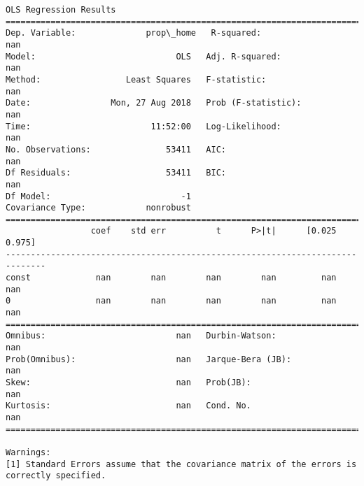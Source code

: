 \documentclass[11pt]{article}
\begin{document}
    \begin{Verbatim}[commandchars=\\\{\}]
                            OLS Regression Results                            
==============================================================================
Dep. Variable:              prop\_home   R-squared:                         nan
Model:                            OLS   Adj. R-squared:                    nan
Method:                 Least Squares   F-statistic:                       nan
Date:                Mon, 27 Aug 2018   Prob (F-statistic):                nan
Time:                        11:52:00   Log-Likelihood:                    nan
No. Observations:               53411   AIC:                               nan
Df Residuals:                   53411   BIC:                               nan
Df Model:                          -1                                         
Covariance Type:            nonrobust                                         
==============================================================================
                 coef    std err          t      P>|t|      [0.025      0.975]
------------------------------------------------------------------------------
const             nan        nan        nan        nan         nan         nan
0                 nan        nan        nan        nan         nan         nan
==============================================================================
Omnibus:                          nan   Durbin-Watson:                     nan
Prob(Omnibus):                    nan   Jarque-Bera (JB):                  nan
Skew:                             nan   Prob(JB):                          nan
Kurtosis:                         nan   Cond. No.                          nan
==============================================================================

Warnings:
[1] Standard Errors assume that the covariance matrix of the errors is correctly specified.

    \end{Verbatim}
\end{document}
